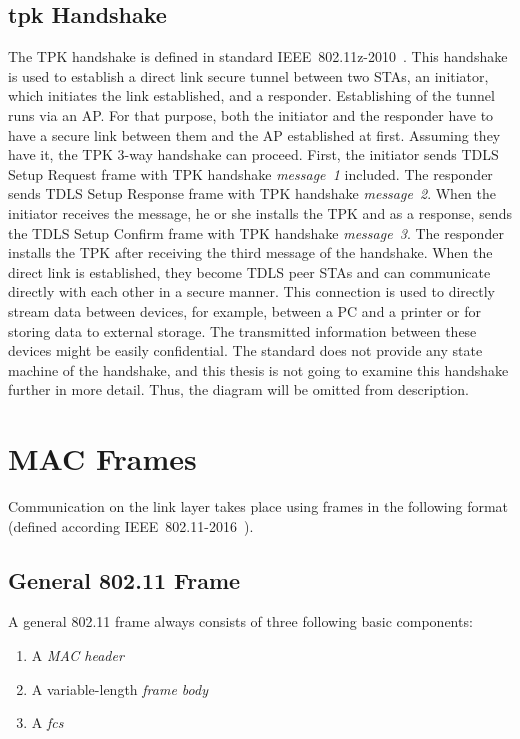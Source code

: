 \subsection{\gls{tpk} Handshake}
The TPK handshake is defined in standard  IEEE~802.11z-2010~\cite{IEEE_802_11z_2010}. This handshake is used to establish a direct link secure tunnel between two STAs, an initiator, which initiates the link established, and a responder. Establishing of the tunnel runs via an AP. For that purpose, both the initiator and the responder have to have a secure link between them and the AP established at first. Assuming they have it, the TPK 3-way handshake can proceed. First, the initiator sends TDLS Setup Request frame with TPK handshake \textit{message~1} included. The responder sends TDLS Setup Response frame with TPK handshake \textit{message~2}. When the initiator receives the message, he or she installs the TPK and as a response, sends the TDLS Setup Confirm frame with TPK handshake \textit{message~3}. The responder installs the TPK after receiving the third message of the handshake. When the direct link is established, they become TDLS peer STAs and can communicate directly with each other in a secure manner. This connection is used to directly stream data between devices, for example, between a PC and a printer or for storing data to external storage. The transmitted information between these devices might be easily confidential. The standard does not provide any state machine of the handshake, and this thesis is not going to examine this handshake further in more detail. Thus, the diagram will be omitted from description.

\section{MAC Frames}
\label{sec: mac_frames}
Communication on the link layer takes place using frames in the following format (defined according IEEE~802.11-2016~\cite{revision2016}).

\subsection{General 802.11 Frame}
A general 802.11 frame always consists of three following basic components:

\begin{enumerate}[\hspace{2cm}(a)]
    \item A \textit{MAC header}
    \item A variable-length \textit{frame body}
    \item A \textit{\gls{fcs}}
\end{enumerate}

